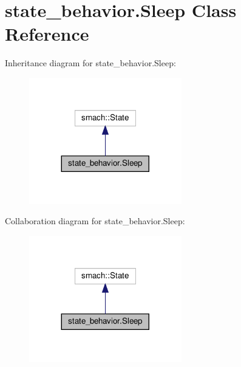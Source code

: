 \hypertarget{classstate__behavior_1_1Sleep}{}\section{state\+\_\+behavior.\+Sleep Class Reference}
\label{classstate__behavior_1_1Sleep}


Inheritance diagram for state\+\_\+behavior.\+Sleep\+:\nopagebreak
\begin{figure}[H]
\begin{center}
\leavevmode
\includegraphics[width=188pt]{classstate__behavior_1_1Sleep__inherit__graph}
\end{center}
\end{figure}


Collaboration diagram for state\+\_\+behavior.\+Sleep\+:\nopagebreak
\begin{figure}[H]
\begin{center}
\leavevmode
\includegraphics[width=188pt]{classstate__behavior_1_1Sleep__coll__graph}
\end{center}
\end{figure}
